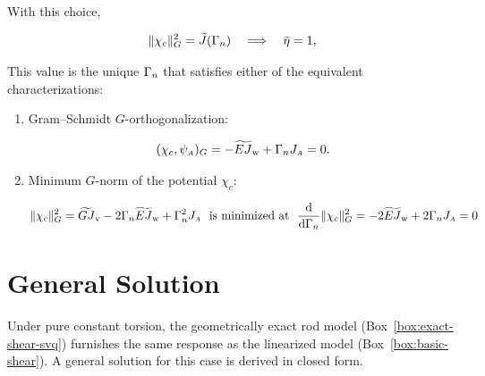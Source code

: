 With this choice,

\[
\|\chi_c\|_G^2=\tilde{J}(\Gamma_{n})\quad\Longrightarrow\quad \bar\eta=1,
\]



\begin{remark}
This value is the unique \(\Gamma_{n}\) that satisfies either of the
equivalent characterizations:

\begin{enumerate}
\def\labelenumi{\arabic{enumi}.}
\tightlist
\item Gram--Schmidt \(G\)-orthogonalization:


\[
(\chi_c,\psi_{\scriptscriptstyle{A}})_G = -\widetilde{EJ}_{\mathrm{w}} + \Gamma_{n}J_{\scriptscriptstyle{A}} = 0.
\]

\item Minimum \(G\)-norm of the potential \(\chi_c\):

\[
\|\chi_c\|_G^2=\GJv-2\EnhanConstFA\EJw+\EnhanConstFA^2\Ja
\ \ \text{is minimized at}\ \ 
\frac{\dd}{\dd \EnhanConstFA}\|\chi_c\|_G^2 = -2\EJw+2\EnhanConstFA\Ja=0
\]

\end{enumerate}
\end{remark}


\section{General Solution}
\label{sec:nonuniform-solution}

Under pure constant torsion, the geometrically exact rod model (Box~\ref{box:exact-shear-svq}) furnishes the same response as the linearized model (Box~\ref{box:basic-shear}). A general solution for this case is derived in closed form.

\iftrue

